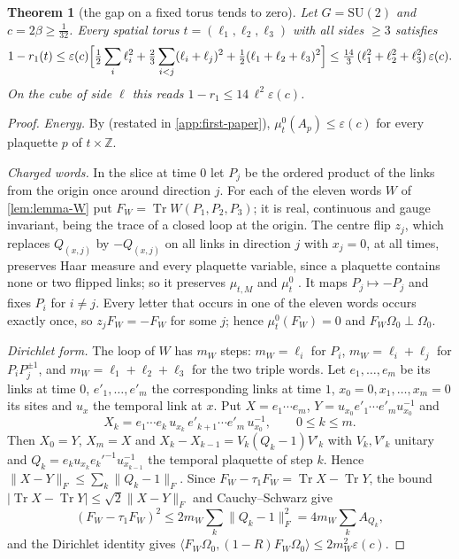 \documentclass[11pt,a4paper]{amsart}
\newtheorem{theorem}{Theorem}[section]
\theoremstyle{definition}
\theoremstyle{remark}
\numberwithin{equation}{section}
\DeclareMathOperator{\Tr}{Tr}        %
\newcommand{\Z}{\mathbb{Z}}          %
\newcommand{\ip}[2]{\langle #1,#2\rangle}  %
\newcommand{\norm}[1]{\lVert #1\rVert}     %
\newcommand{\abs}[1]{\lvert #1\rvert}      %
\newcommand{\SU}{\mathrm{SU}}              %
\newcommand{\Omegazero}{\Omega_0}          %
\begin{document}
\begin{theorem}[the gap on a fixed torus tends to zero]\label{thm:fixed-torus-gap}
Let $G=\SU(2)$ and $c=2\beta\ge\frac1{32}$. Every spatial torus $t=(\ell_1,\ell_2,\ell_3)$ with all sides $\ge3$ satisfies
\[
1-r_1(t)\le\varepsilon(c)\Bigl[\tfrac12\sum_i\ell_i^2+\tfrac23\sum_{i<j}(\ell_i+\ell_j)^2+\tfrac12(\ell_1+\ell_2+\ell_3)^2\Bigr]\le\tfrac{14}{3}\,(\ell_1^2+\ell_2^2+\ell_3^2)\,\varepsilon(c).
\]
On the cube of side $\ell$ this reads $1-r_1\le14\,\ell^2\varepsilon(c)$.
\end{theorem}

\begin{proof}
\emph{Energy.} By \cite[Theorem~8, Step~1]{bhattacharjee2026first} (restated in \cref{app:first-paper}), $\mu^0_t(A_p)\le\varepsilon(c)$ for every plaquette $p$ of $t\times\Z$.

\emph{Charged words.} In the slice at time $0$ let $P_j$ be the ordered product of the links from the origin once around direction $j$. For each of the eleven words $W$ of \cref{lem:lemma-W} put $F_W=\Tr W(P_1,P_2,P_3)$; it is real, continuous and gauge invariant, being the trace of a closed loop at the origin. The centre flip $z_j$, which replaces $Q_{(x,j)}$ by $-Q_{(x,j)}$ on all links in direction $j$ with $x_j=0$, at all times, preserves Haar measure and every plaquette variable, since a plaquette contains none or two flipped links; so it preserves $\mu_{t,M}$ and $\mu^0_t$ \cite[Theorem~8, Step~2]{bhattacharjee2026first}. It maps $P_j\mapsto-P_j$ and fixes $P_i$ for $i\ne j$. Every letter that occurs in one of the eleven words occurs exactly once, so $z_jF_W=-F_W$ for some $j$; hence $\mu^0_t(F_W)=0$ and $F_W\Omegazero\perp\Omegazero$.

\emph{Dirichlet form.} The loop of $W$ has $m_W$ steps: $m_W=\ell_i$ for $P_i$, $m_W=\ell_i+\ell_j$ for $P_iP_j^{\pm1}$, and $m_W=\ell_1+\ell_2+\ell_3$ for the two triple words. Let $e_1,\dots,e_m$ be its links at time $0$, $e'_1,\dots,e'_m$ the corresponding links at time $1$, $x_0=0,x_1,\dots,x_m=0$ its sites and $u_x$ the temporal link at $x$. Put $X=e_1\cdots e_m$, $Y=u_{x_0}e'_1\cdots e'_mu_{x_0}^{-1}$ and
\[
X_k=e_1\cdots e_k\,u_{x_k}\,e'_{k+1}\cdots e'_m\,u_{x_0}^{-1},\qquad0\le k\le m.
\]
Then $X_0=Y$, $X_m=X$ and $X_k-X_{k-1}=V_k(Q_k-1)V'_k$ with $V_k,V'_k$ unitary and $Q_k=e_ku_{x_k}e_k'^{-1}u_{x_{k-1}}^{-1}$ the temporal plaquette of step $k$. Hence $\norm{X-Y}_F\le\sum_k\norm{Q_k-1}_F$. Since $F_W-\tau_1F_W=\Tr X-\Tr Y$, the bound $\abs{\Tr X-\Tr Y}\le\sqrt2\norm{X-Y}_F$ and Cauchy--Schwarz give
\[
(F_W-\tau_1F_W)^2\le2m_W\sum_k\norm{Q_k-1}_F^2=4m_W\sum_kA_{Q_k},
\]
and the Dirichlet identity gives $\ip{F_W\Omegazero}{(1-R)F_W\Omegazero}\le2m_W^2\varepsilon(c)$.


\end{proof}
\end{document}
